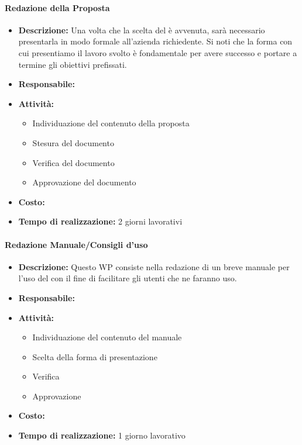 \paragraph{Redazione della Proposta }
\begin{itemize}
\item{\bfseries Descrizione:} Una volta che la scelta del  è avvenuta, sarà necessario presentarla in modo formale all'azienda richiedente. Si noti che la forma con cui presentiamo il lavoro svolto è fondamentale per avere successo e portare a termine gli obiettivi prefissati.
\item {\bfseries Responsabile:}
\item  {\bfseries Attività:}
	\begin{itemize}
	\item Individuazione del contenuto della proposta
	\item Stesura del documento
	\item Verifica del documento
 	\item Approvazione del documento	
	\end{itemize}

\item  {\bfseries Costo:}
\item  {\bfseries Tempo di realizzazione:} 2 giorni lavorativi
\end{itemize}


\paragraph{Redazione Manuale/Consigli d'uso}
\begin{itemize}
\item{\bfseries Descrizione:} Questo WP consiste nella redazione di un breve manuale per l'uso del  con il fine di facilitare gli utenti che ne faranno uso.
\item {\bfseries Responsabile:}
\item  {\bfseries Attività:}
	\begin{itemize}
	\item Individuazione del contenuto del manuale
	\item Scelta della forma di presentazione
	\item Verifica 
 	\item Approvazione	
	\end{itemize}

\item  {\bfseries Costo:}
\item  {\bfseries Tempo di realizzazione:}  1 giorno lavorativo
\end{itemize}

